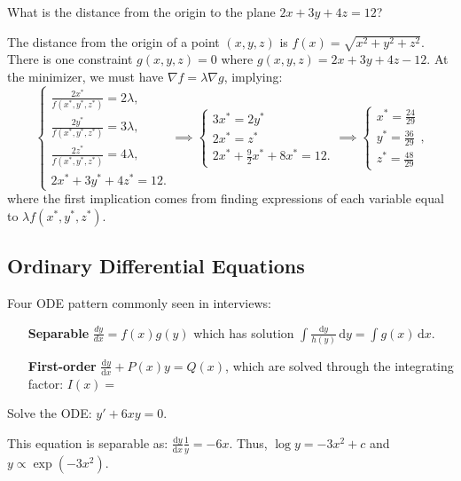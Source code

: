 \begin{qanda} %
    \Q What is the distance from the origin to the plane $2x + 3y + 4z = 12$?

    \A 
    The distance from the origin of a point $(x, y,z)$ is $f(x)=\sqrt{x^2 + y^2 + z^2}$.
    There is one constraint $g(x,y,z) = 0$ where $g(x,y,z)=2x + 3y + 4z - 12$.
    At the minimizer, we must have $\nabla f = \lambda \nabla g$, implying:
    \[
        \begin{cases}
            \frac{2x^*}{f(x^*, y^*, z^*)} = 2\lambda, \\
            \frac{2y^*}{f(x^*, y^*, z^*)} = 3\lambda, \\
            \frac{2z^*}{f(x^*, y^*, z^*)} = 4\lambda, \\
            2x^* + 3y^* + 4z^* = 12.
        \end{cases}
        \implies
        \begin{cases}
            3 x^* = 2 y^* \\
            2 x^* = z^* \\
            2x^* + \frac{9}{2}x^* + 8x^* = 12.
        \end{cases}
        \implies 
        \begin{cases}
            x^* = \frac{24}{29} \\
            y^* = \frac{36}{29} \\
            z^* = \frac{48}{29}
        \end{cases}
        ,
    \]
    where the first implication comes from finding expressions of each variable equal to $\lambda f(x^*, y^*, z^*)$.
\end{qanda}

\subsection{Ordinary Differential Equations}

Four ODE pattern commonly seen in interviews:
\begin{itemize}
    \item[\textbf{Separable}] $\frac{dy}{dx} = f(x)g(y)$ which has solution $\int \frac{\mathrm{d}y}{h(y)}\, \mathrm{d}y = \int g(x) \, \mathrm{d}x.$
    \item[\textbf{First-order}] $\frac{\mathrm{d}y}{\mathrm{d}x} + P(x)y = Q(x)$, which are solved through the integrating factor: $I(x) = $
\end{itemize}

\begin{qanda} %
    \Q
    Solve the ODE: $y' + 6xy = 0$.

    \A
    This equation is separable as: $\frac{\mathrm{d}y}{\mathrm{d}x} \frac{1}{y} = -6x$. 
    Thus, $\log y = -3 x^2 + c$ and $y \propto  \exp \left( -3 x^2 \right)$.
\end{qanda}

